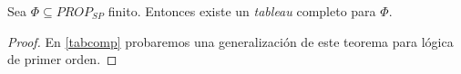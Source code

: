 \begin{prop}\label{compi}
Sea $\Phi \subseteq PROP_{SP}$ finito. Entonces existe un \textit{tableau} completo para $\Phi$.
\end{prop}
\begin{proof}
En \ref{tabcomp} probaremos una generalización de este teorema para lógica de primer orden.

\end{proof}

